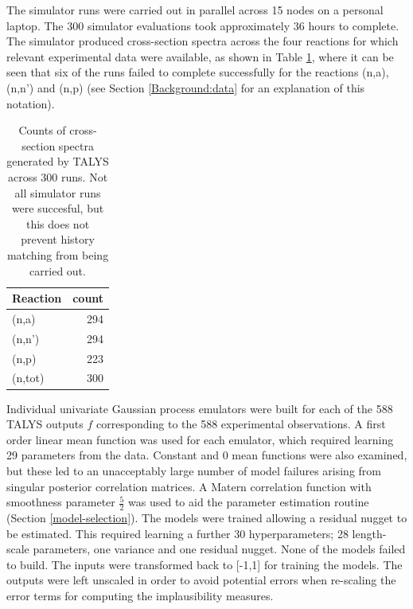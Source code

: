 \documentclass[
  12pt,
  a4paper,
  twoside]{book}
\begin{document}
The simulator runs were carried out in parallel across 15 nodes on a personal laptop. The 300 simulator evaluations took approximately 36 hours to complete. The simulator produced cross-section spectra across the four reactions for which relevant experimental data were available, as shown in Table \ref{tab:run-data}, where it can be seen that six of the runs failed to complete successfully for the reactions (n,a), (n,n') and (n,p) (see Section \ref{Background:data} for an explanation of this notation).

\begin{table}

\caption{\label{tab:run-data}Counts of cross-section spectra generated by TALYS across 300 runs. Not all simulator runs were succesful, but this does not prevent history matching from being carried out.}
\centering
\begin{tabular}[t]{l|r}
\hline
Reaction & count\\
\hline
(n,a) & 294\\
\hline
(n,n') & 294\\
\hline
(n,p) & 223\\
\hline
(n,tot) & 300\\
\hline
\end{tabular}
\end{table}

Individual univariate Gaussian process emulators were built for each of the 588 TALYS outputs \(f\) corresponding to the 588 experimental observations. A first order linear mean function was used for each emulator, which required learning 29 parameters from the data. Constant and 0 mean functions were also examined, but these led to an unacceptably large number of model failures arising from singular posterior correlation matrices. A Matern correlation function with smoothness parameter \(\frac{5}{2}\) was used to aid the parameter estimation routine (Section \ref{model-selection}). The models were trained allowing a residual nugget to be estimated. This required learning a further 30 hyperparameters; 28 length-scale parameters, one variance and one residual nugget. None of the models failed to build. The inputs were transformed back to {[}-1,1{]} for training the models. The outputs were left unscaled in order to avoid potential errors when re-scaling the error terms for computing the implausibility measures.
\end{document}
